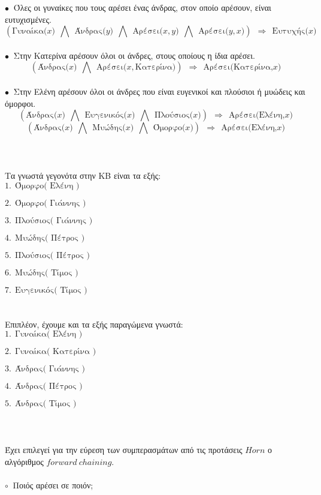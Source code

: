\documentclass[10pt]{article}
\begin{document}
$\bullet \ $ Όλες οι γυναίκες που τους αρέσει ένας άνδρας, στον οποίο αρέσουν, είναι ευτυχισμένες. 
\[
\left( \text{Γυναίκα($x$)} \ \ \bigwedge \ \ \text{Άνδρας($y$)} \ \ \bigwedge \ \  \text{Αρέσει($x,y$)} \ \ \bigwedge \ \  \text{Αρέσει($y,x$)} \right) \ \ \Rightarrow \ \ \text{Ευτυχής($x$)}
\]\\

$\bullet \ $ Στην Κατερίνα αρέσουν όλοι οι άνδρες, στους οποίους η ίδια αρέσει.
\[
\left( \text{Άνδρας($x$)} \ \ \bigwedge \ \  \text{Αρέσει($x,$Κατερίνα)} \right) \ \ \Rightarrow \ \ \text{Αρέσει(Κατερίνα,$x$)} 
\]\\

$\bullet \ $ Στην Ελένη αρέσουν όλοι οι άνδρες που είναι ευγενικοί και πλούσιοι ή μυώδεις και όμορφοι. 
\[
\left( \text{Άνδρας($x$)} \ \ \bigwedge \ \  \text{Ευγενικός($x$)} \ \ \bigwedge \ \  \text{Πλούσιος($x$)} \right) \ \ \Rightarrow \ \ \text{Αρέσει(Ελένη,$x$)} 
\]
\[
\left( \text{Άνδρας($x$)} \ \ \bigwedge \ \  \text{Μυώδης($x$)} \ \ \bigwedge \ \  \text{Όμορφο($x$)} \right) \ \ \Rightarrow \ \ \text{Αρέσει(Ελένη,$x$)} 
\]\\ \\ \\
Τα γνωστά γεγονότα στην ΚΒ είναι τα εξής: \\

$ 1. \ \ \text{Όμορφο( \ Ελένη \ )} $

$ 2. \ \ \text{Όμορφο( \ Γιάννης \ )} $

$ 3. \ \ \text{Πλούσιος( \ Γιάννης \ )} $

$ 4. \ \ \text{Μυώδης( \ Πέτρος \ )} $

$ 5. \ \ \text{Πλούσιος( \ Πέτρος \ )}$

$ 6. \ \ \text{Μυώδης( \ Τίμος\ )} $

$ 7. \ \ \text{Ευγενικός( \ Τίμος \ )}$ \\ \\ \\
Επιπλέον, έχουμε και τα εξής παραγώμενα γνωστά: \\

$ 1. \ \ \text{Γυναίκα( \ Ελένη \ )} $

$ 2. \ \ \text{Γυναίκα( \ Κατερίνα \ )} $

$ 3. \ \ \text{Άνδρας( \ Γιάννης \ )} $

$ 4. \ \ \text{Άνδρας( \ Πέτρος \ )} $

$ 5. \ \ \text{Άνδρας( \ Τίμος \ )} $ \\ \\ \\ \\ Έχει επιλεγεί για την εύρεση των συμπερασμάτων από τις προτάσεις $Horn$ ο αλγόριθμος $ forward \  chaining $. \\ \\
$\circ \ $  Ποιός αρέσει σε ποιόν; \\
\end{document}
